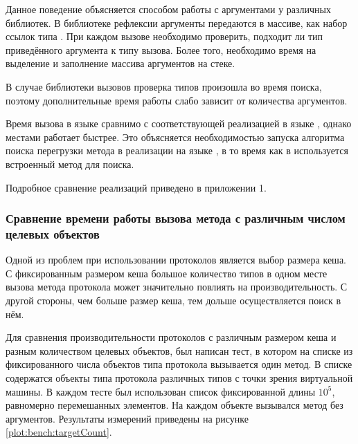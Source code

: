 Данное поведение объясняется способом работы с аргументами у различных библиотек. В библиотеке рефлексии аргументы передаются в массиве, как набор ссылок типа . При каждом вызове необходимо проверить, подходит ли тип приведённого аргумента к типу вызова. Более того, необходимо время на выделение и заполнение массива аргументов на стеке.

В случае библиотеки вызовов проверка типов произошла во время поиска, поэтому дополнительные время работы слабо зависит от количества аргументов.

Время вызова в языке  сравнимо с соответствующей реализацией в языке , однако местами работает быстрее. Это объясняется необходимостью запуска алгоритма поиска перегрузки метода в реализации на языке , в то время как в  используется встроенный метод для поиска.

Подробное сравнение реализаций приведено в приложении 1.

\subsubsection{Сравнение времени работы вызова метода с различным числом целевых объектов}
Одной из проблем при использовании протоколов является выбор размера кеша. С фиксированным размером кеша большое количество типов в одном месте вызова метода протокола может значительно повлиять на  производительность. С другой стороны, чем больше размер кеша, тем дольше осуществляется поиск в нём.

Для сравнения производительности протоколов с различным размером кеша и разным количеством целевых объектов, был написан тест, в котором на списке из фиксированного числа объектов типа протокола вызывается один метод. В списке содержатся объекты типа протокола различных типов с точки зрения виртуальной машины. В каждом тесте был использован список фиксированной длины $10^5$, равномерно перемешанных элементов. На каждом объекте вызывался метод без аргументов. Результаты измерений приведены на рисунке \ref{plot:bench:targetCount}.

